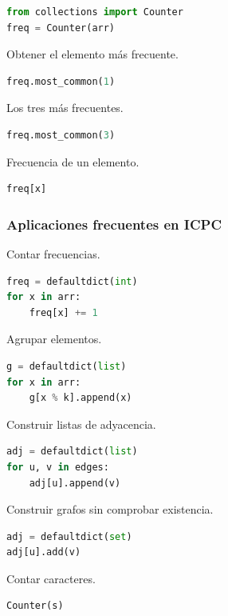 \begin{lstlisting}[language=Python]
from collections import Counter
freq = Counter(arr)
\end{lstlisting}

Obtener el elemento más frecuente.

\begin{lstlisting}[language=Python]
freq.most_common(1)
\end{lstlisting}

Los tres más frecuentes.

\begin{lstlisting}[language=Python]
freq.most_common(3)
\end{lstlisting}

Frecuencia de un elemento.

\begin{lstlisting}[language=Python]
freq[x]
\end{lstlisting}

\vspace{0.3cm}

\subsubsection{Aplicaciones frecuentes en ICPC}

Contar frecuencias.
\begin{lstlisting}[language=Python]
freq = defaultdict(int)
for x in arr:
    freq[x] += 1
\end{lstlisting}

Agrupar elementos.
\begin{lstlisting}[language=Python]
g = defaultdict(list)
for x in arr:
    g[x % k].append(x)
\end{lstlisting}

Construir listas de adyacencia.
\begin{lstlisting}[language=Python]
adj = defaultdict(list)
for u, v in edges:
    adj[u].append(v)
\end{lstlisting}

Construir grafos sin comprobar existencia.

\begin{lstlisting}[language=Python]
adj = defaultdict(set)
adj[u].add(v)
\end{lstlisting}

Contar caracteres.

\begin{lstlisting}[language=Python]
Counter(s)
\end{lstlisting}

